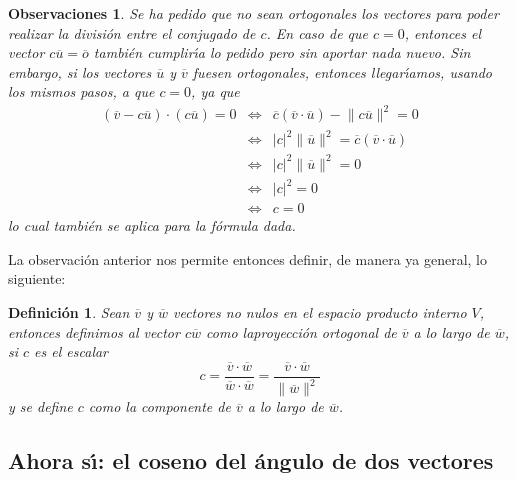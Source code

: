\documentclass[a4paper,11pt]{article}
\theoremstyle{teoremas}
\theoremstyle{ejemplos}
\theoremstyle{definiciones}
\theoremstyle{lemas}
\newtheorem*{definicion}{Definici\'on}
\newtheorem*{observaciones}{Observaciones}
\begin{document}
\begin{observaciones}
 Se ha pedido que no sean ortogonales los vectores para poder realizar la divisi\'on entre el conjugado de $c$. En caso de que $c=0$, entonces el vector $c\overline{u} = \overline{o}$ tambi\'en cumplir\'{\i}a lo pedido pero sin aportar nada nuevo. Sin embargo, si los vectores $\overline{u}$ y $\overline{v}$ fuesen ortogonales, entonces llegar\'{\i}amos, usando los mismos pasos, a que $c=0$, ya que
 \begin{eqnarray*}
  \left( \overline{v} - c\overline{u} \right)\cdot \left( c\overline{u} \right) = 0
   & \Leftrightarrow & \overline{c} \left( \overline{v} \cdot \overline{u} \right) - \lVert c\overline{u} \rVert^2 = 0 \\
   & \Leftrightarrow & \lvert c \rvert^2 \lVert \overline{u} \rVert^2 = \overline{c} \left( \overline{v} \cdot \overline{u} \right) \\
   & \Leftrightarrow & \lvert c \rvert^2 \lVert \overline{u} \rVert^2 = 0 \\
   & \Leftrightarrow & \lvert c \rvert^2 = 0 \\
   & \Leftrightarrow & c = 0
 \end{eqnarray*}
 lo cual tambi\'en se aplica para la f\'ormula dada.
\end{observaciones}
La observaci\'on anterior nos permite entonces definir, de manera ya general, lo siguiente:
\begin{definicion}
 Sean $\overline{v}$ y $\overline{w}$ vectores no nulos en el espacio producto interno $V$, entonces definimos al vector $c\overline{w}$ como la\textit{proyecci\'on ortogonal de $\overline{v}$ a lo largo de $\overline{w}$}, si $c$ es el escalar
 \begin{equation}
  c = \frac{\overline{v} \cdot \overline{w}}{\overline{w}\cdot\overline{w}} = \frac{\overline{v} \cdot \overline{w}}{\lVert \overline{w} \rVert^2}
 \end{equation}
 y se define $c$ como la \textit{componente} de $\overline{v}$ a lo largo de $\overline{w}$.
\end{definicion}

\subsection{Ahora s\'{\i}: el coseno del \'angulo de dos vectores}
\end{document}
